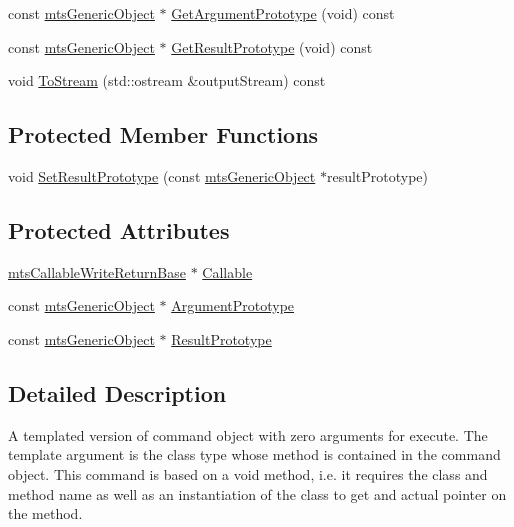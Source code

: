 \begin{DoxyCompactItemize}
\item 
const \hyperlink{classmts_generic_object}{mts\-Generic\-Object} $\ast$ \hyperlink{classmts_command_write_return_a6332f4612d821a195472d4a36be4303f}{Get\-Argument\-Prototype} (void) const 
\item 
const \hyperlink{classmts_generic_object}{mts\-Generic\-Object} $\ast$ \hyperlink{classmts_command_write_return_aab5e107d3cd4837b8820e91089b38400}{Get\-Result\-Prototype} (void) const 
\item 
void \hyperlink{classmts_command_write_return_a6e30a4119ea2ef2466c0f3b46479cc3e}{To\-Stream} (std\-::ostream \&output\-Stream) const 
\end{DoxyCompactItemize}
\subsection*{Protected Member Functions}
\begin{DoxyCompactItemize}
\item 
void \hyperlink{classmts_command_write_return_a23691915a84b24a9eb08e75ed8b347c2}{Set\-Result\-Prototype} (const \hyperlink{classmts_generic_object}{mts\-Generic\-Object} $\ast$result\-Prototype)
\end{DoxyCompactItemize}
\subsection*{Protected Attributes}
\begin{DoxyCompactItemize}
\item 
\hyperlink{classmts_callable_write_return_base}{mts\-Callable\-Write\-Return\-Base} $\ast$ \hyperlink{classmts_command_write_return_ada842b5e68290a2c53de66702025f4ab}{Callable}
\item 
const \hyperlink{classmts_generic_object}{mts\-Generic\-Object} $\ast$ \hyperlink{classmts_command_write_return_a21b712fb9036e3dfad2d67c5f15932d2}{Argument\-Prototype}
\item 
const \hyperlink{classmts_generic_object}{mts\-Generic\-Object} $\ast$ \hyperlink{classmts_command_write_return_a02ec49cd66e7d95bd1ac9d08e5eb8cae}{Result\-Prototype}
\end{DoxyCompactItemize}


\subsection{Detailed Description}
A templated version of command object with zero arguments for execute. The template argument is the class type whose method is contained in the command object. This command is based on a void method, i.\-e. it requires the class and method name as well as an instantiation of the class to get and actual pointer on the method. 


